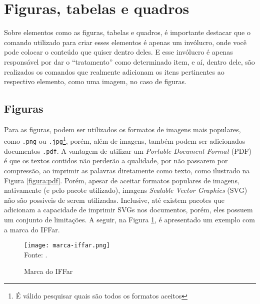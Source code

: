\section{Figuras, tabelas e quadros}
  Sobre elementos como as figuras, tabelas e quadros, é importante destacar que o comando utilizado para criar esses elementos é apenas um invólucro, onde você pode colocar o conteúdo que quiser dentro deles. E esse invólucro é apenas responsável por dar o ``tratamento'' como determinado item, e aí, dentro dele, são realizados os comandos que realmente adicionam os itens pertinentes ao respectivo elemento, como uma imagem, no caso de figuras.
  
\subsection{Figuras}
  Para as figuras, podem ser utilizados os formatos de imagens mais populares, como \verb|.png| ou \verb|.jpg|\footnote{É válido pesquisar quais são todos os formatos aceitos}, porém, além de imagens, também podem ser adicionados documentos \verb|.pdf|. A vantagem de utilizar um \textit{Portable Document Format} (PDF) é que os textos contidos não perderão a qualidade, por não passarem por compressão, ao imprimir as palavras diretamente como texto, como ilustrado na Figura \ref{figura:pdf}. Porém, apesar de aceitar formatos populares de imagens, nativamente (e pelo pacote utilizado), imagens \textit{Scalable Vector Graphics} (SVG) não são possiveis de serem utilizadas. Inclusive, até existem pacotes que adicionam a capacidade de imprimir SVGs nos documentos, porém, eles possuem um conjunto de limitações\footnotemark. A seguir, na Figura \ref{figura:marca-iffar}, é apresentado um exemplo com a marca do IFFar.

  \begin{figure}[H]
    \Centering\singlespacing
    \caption{Marca do IFFar}
    \label{figura:marca-iffar} %
    \texttt{[image: marca-iffar.png]}\\
    \footnotesize
    Fonte: \textcite{site:iffar-identidade-visual-2021}.
  \end{figure}

